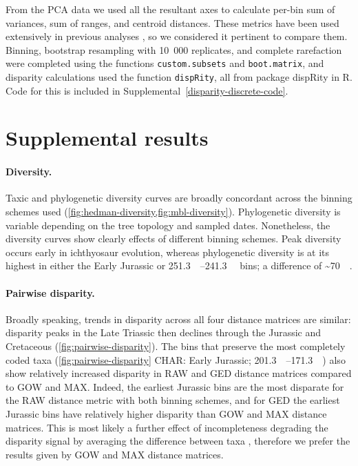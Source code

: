 \documentclass[british,a4paper]{article}
\newcommand\pcref[1]{(\cref{#1})}
\begin{document}
From the PCA data we used all the resultant axes to calculate per-bin sum of variances, sum of ranges, and centroid distances. These metrics have been used extensively in previous analyses \autocite{Wills1998, Thorne2011, Flannery-Sutherland2019}, so we considered it pertinent to compare them. Binning, bootstrap resampling with 10~000 replicates, and complete rarefaction were completed using the functions \texttt{custom.subsets} and \texttt{boot.matrix}, and disparity calculations used the function \texttt{dispRity}, all from package dispRity \autocite{Guillerme2018b} in R. Code for this is included in Supplemental~\ref{disparity-discrete-code}.


\section{Supplemental results}\label{sec:supplemental-results}

\paragraph{Diversity.}\label{par:diversity}

Taxic and phylogenetic diversity curves are broadly concordant across the binning schemes used \pcref{fig:hedman-diversity,fig:mbl-diversity}. Phylogenetic diversity is variable depending on the tree topology and sampled dates. Nonetheless, the diversity curves show clearly effects of different binning schemes. Peak diversity occurs early in ichthyosaur evolution, whereas phylogenetic diversity is at its highest in either the Early Jurassic or \SIrange{251.3}{241.3}{\mega\annum} bins; a difference of \textasciitilde{}\SI{70}{\million\years}.

\paragraph{Pairwise disparity.}\label{par:pairwise-disparity}

Broadly speaking, trends in disparity across all four distance matrices are similar: disparity peaks in the Late Triassic then declines through the Jurassic and Cretaceous \pcref{fig:pairwise-disparity}. The bins that preserve the most completely coded taxa (\cref{fig:pairwise-disparity} CHAR: Early Jurassic; \SIrange{201.3}{171.3}{\mega\annum}) also show relatively increased disparity in RAW and GED distance matrices compared to GOW and MAX. Indeed, the earliest Jurassic bins are the most disparate for the RAW distance metric with both binning schemes, and for GED the earliest Jurassic bins have relatively higher disparity than GOW and MAX distance matrices. This is most likely a further effect of incompleteness degrading the disparity signal by averaging the difference between taxa \autocite{Flannery-Sutherland2019, Lehmann2019}, therefore we prefer the results given by GOW and MAX distance matrices.
\end{document}
